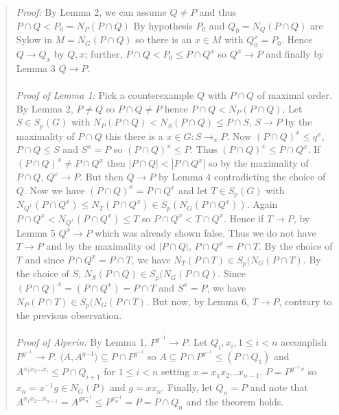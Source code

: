\begin{quote}
\emph{Proof:}
By Lemma 2, we can assume $Q \ne P$ and thus $P \cap Q < P_0 = N_P(P \cap Q)$
By hypothesis $P_0$ and $Q_0= N_Q(P \cap Q)$ are Sylow in $M=N_G(P \cap Q)$ so there is
an $x \in M$ with $Q_0^x=P_0$.  Hence $Q \rightarrow Q_x$ by $Q, x$; further,
$P \cap Q < P_0 \le P \cap Q^x$ so $Q^x \rightarrow P$ and finally by Lemma 3 $Q \rightarrow P$.
\\
\\
\emph{Proof of Lemma 1:}
Pick a counterexample $Q$ with $P \cap Q$ of maximal order.  By Lemma 2, $P \ne Q$ so
$P \cap Q \ne P$ hence $P \cap Q < N_P(P \cap Q)$.  Let $S \in S_p(G)$ with
$N_P(P \cap Q) < N_S(P \cap Q) \le P \cap S$, $S \rightarrow P$ by the maximality of
$P \cap Q$ this there is a $x \in G: S \rightarrow_x P$.  Now $(P \cap Q)^x \le q^x$,
$P \cap Q \le S$ and $S^x=P$ so $(P \cap Q)^x \le P$.  Thus
$(P \cap Q)^x \le P \cap Q^x$.  If $(P \cap Q)^x \ne P \cap Q^x$ then
$|P \cap Q| < |P \cap Q^x|$ so by the maximality of $P \cap Q$, $Q^x \rightarrow P$.  But
then $Q \rightarrow P$ by Lemma 4 contradicting the choice of $Q$.  Now we have
$(P \cap Q)^x = P \cap Q^x$ and let $T \in S_p(G)$ with 
$N_{Q^x}(P \cap Q^x) \le
N_{T}(P \cap Q^x) \in S_p(N_G(P \cap Q^x))$.  Again
$P \cap Q^x < N_{Q^x}(P \cap Q^x) \le T$ so $P \cap Q^x < T \cap Q^x$.  Hence if
$T \rightarrow P$, by Lemma 5 $Q^x \rightarrow P$ which was already shown false.  Thus
we do not have $T \rightarrow P$ and by the maximality od $|P \cap Q|$,
$P \cap Q^x = P \cap T$.
By the choice of $T$ and since $P \cap Q^x = P \cap T$, we have
$N_T(P \cap T) \in S_p(N_G(P \cap T)$.
By the choice of $S$, 
$N_S(P \cap Q) \in S_p(N_G(P \cap Q)$.  Since
$(P \cap Q)^x = (P \cap Q^x) = P \cap T$ and $S^x=P$, we have 
$N_P(P \cap T) \in S_p(N_G(P \cap T)$.  But now, by Lemma 6, $T \rightarrow P$, contrary to the
previous observation.
\\
\\
\emph{Proof of Alperin:}  By Lemma 1, $P^{g^{-1}} \rightarrow P$.  Let 
$Q_i, x_i, 1 \le i < n$ accomplish
$P^{g^{-1}} \rightarrow P$. $ \langle A, A^{g{-1}} \rangle \subseteq P \cap P^{g^{-1}}$ so
$A \subseteq P \cap P^{g^{-1}} \le (P \cap Q_1)$ and $A^{x_1 x_2 \ldots x_i}
\le P \cap Q_{i+1}$
for $1 \le i < n$ setting $x=x_1 x_2 \ldots x_{n-1}$.
$P = P^{g^{-1}x}$ so $x_n=x^{-1}g \in N_G(P)$ and
$g= x x_n$.  Finally, let $Q_n=P$ and note that
$A^{x_1 x_2 \ldots x_{n-1}}= A^{g x_n^{-1}} \le P^{x_n^{-1}}=P=P \cap Q_n$ and 
the theorem holds.
\end{quote}
